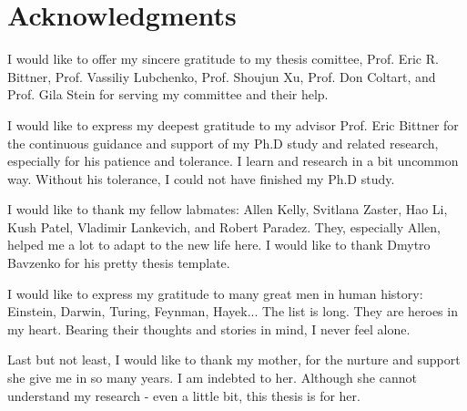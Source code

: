 \begingroup
\let\clearpage\relax
\let\cleardoublepage\relax
\let\cleardoublepage\relax
\chapter*{Acknowledgments}


I would like to offer my sincere gratitude to my thesis comittee, Prof. Eric R. Bittner, Prof. Vassiliy Lubchenko, Prof. Shoujun Xu, Prof. Don Coltart, and Prof. Gila Stein for serving my committee and their help.

I would like to express my deepest gratitude to my advisor Prof. Eric Bittner for the continuous guidance and support of my Ph.D study and related research, especially for his patience and tolerance. I learn and research in a bit uncommon way. Without his tolerance, I could not have finished my Ph.D study.

I would like to thank my fellow labmates: Allen Kelly, Svitlana Zaster, Hao Li, Kush Patel, Vladimir Lankevich, and Robert Paradez. They, especially Allen, helped me a lot to adapt to the new life here. I would like to thank Dmytro Bavzenko for his pretty thesis template.

I would like to express my gratitude to many great men in human history: Einstein, Darwin, Turing, Feynman, Hayek... The list is long. They are heroes in my heart. Bearing their thoughts and stories in mind, I never feel alone.

Last but not least, I would like to thank my mother, for the nurture and support she give me in so many years. I am indebted to her. Although she cannot understand my research - even a little bit, this thesis is for her.
\endgroup



